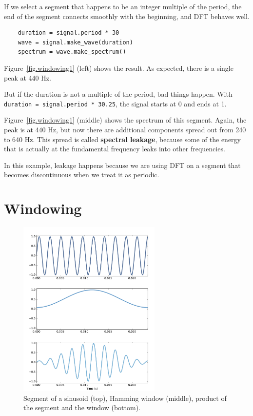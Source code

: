 \documentclass[12pt]{book}
\begin{document}
If we select a segment that happens to be an integer multiple of
the period, the end of the segment connects smoothly with the
beginning, and DFT behaves well.

\begin{verbatim}
    duration = signal.period * 30
    wave = signal.make_wave(duration)
    spectrum = wave.make_spectrum()
\end{verbatim}

Figure~\ref{fig.windowing1} (left) shows the result.  As expected,
there is a single peak at 440 Hz.

But if the duration is not a multiple of the period, bad things
happen.  With {\tt duration = signal.period * 30.25}, the signal
starts at 0 and ends at 1.

Figure~\ref{fig.windowing1} (middle) shows
the spectrum of this segment.  Again, the peak is at 440 Hz, but now
there are additional components spread out from 240 to 640 Hz.  This
spread is called {\bf spectral leakage}, because some of the energy that
is actually at the fundamental frequency leaks into other frequencies.

In this example, leakage happens because we are using DFT on a segment
that becomes discontinuous when we treat it as periodic.


\section{Windowing}

\begin{figure}
\centerline{\includegraphics[height=3.5in]{figs/windowing2.pdf}}
\caption{Segment of a sinusoid (top), Hamming window (middle), product
of the segment and the window (bottom).}
\label{fig.windowing2}
\end{figure}
\end{document}
